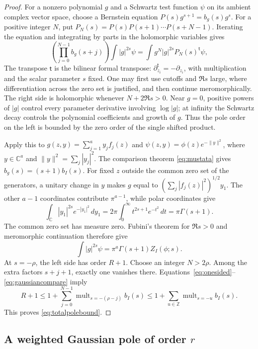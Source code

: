 \documentclass[11pt,a4paper]{article}
\numberwithin{equation}{section}
\theoremstyle{definition}
\newcommand{\C}{\mathbb C}
\newcommand{\Z}{\mathbb Z}
\DeclareMathOperator{\mult}{mult}
\begin{document}
\begin{proof}
For a nonzero polynomial $g$ and a Schwartz test function $\psi$
on its ambient complex vector space, choose a Bernstein equation
$P(s)g^{s+1}=b_g(s)g^s$. For a positive integer $N$, put
$P_N(s)=P(s)P(s+1)\cdots P(s+N-1)$.
Iterating the equation and integrating by parts in the holomorphic
variables gives
\begin{equation}\label{eq:onesided}
\left(\prod_{j=0}^{N-1}b_g(s+j)\right)
       \int |g|^{2s}\psi
=\int g^N|g|^{2s}P_N(s)^{\mathsf t}\psi,
\end{equation}
The transpose $\mathsf t$ is the bilinear formal transpose:
$\partial_{z_i}^{\mathsf t}=-\partial_{z_i}$, with multiplication
and the scalar parameter $s$ fixed. One may first use
cutoffs and $\Re s$ large, where differentiation across the zero set
is justified, and then continue meromorphically. The right side is
holomorphic whenever $N+2\Re s>0$. Near $g=0$, positive powers of
$|g|$ control every parameter derivative involving $\log|g|$; at
infinity the Schwartz decay controls the polynomial coefficients and
growth of $g$. Thus the pole order on the left is bounded by the
zero order of the single shifted product.

Apply this to
$g(z,y)=\sum_{j=1}^a y_jf_j(z)$ and
$\psi(z,y)=\phi(z)e^{-\|y\|^2}$, where $y\in\C^a$ and
$\|y\|^2=\sum_j|y_j|^2$.
The comparison theorem \eqref{eq:mustata} gives
$b_g(s)=(s+1)b_I(s)$.
For fixed $z$ outside the common zero set of the generators, a unitary
change in $y$ makes $g$ equal to $(\sum_j|f_j(z)|^2)^{1/2}y_1$.
The other $a-1$ coordinates contribute $\pi^{a-1}$, while
polar coordinates give
\[
\int_{\C}|y_1|^{2s}e^{-|y_1|^2}\,dy_1
=2\pi\int_0^\infty t^{2s+1}e^{-t^2}\,dt=\pi\Gamma(s+1).
\]
The common zero set has measure zero. Fubini's theorem for
$\Re s>0$ and meromorphic continuation therefore give
\begin{equation}\label{eq:gaussiancompare}
\int |g|^{2s}\psi=\pi^a\Gamma(s+1)Z_I(\phi;s).
\end{equation}
At $s=-\rho$, the left side has order $R+1$. Choose an integer
$N>2\rho$. Among the extra factors $s+j+1$, exactly one vanishes
there. Equations~\eqref{eq:onesided}--\eqref{eq:gaussiancompare} imply
\[
R+1\le 1+\sum_{j=0}^{N-1}\mult_{s=-(\rho-j)}b_I(s)
\le1+\sum_{u\in\Z}\mult_{s=-u}b_I(s).
\]
This proves \eqref{eq:totalpolebound}.
\end{proof}

\subsection{A weighted Gaussian pole of order \texorpdfstring{$r$}{r}}\label{subsec:integerpole}
\end{document}
